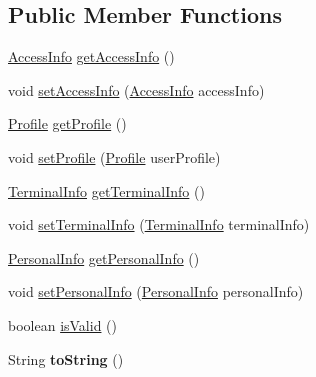 \subsection*{Public Member Functions}
\begin{DoxyCompactItemize}
\item 
\hyperlink{classcom_1_1bluevia_1_1directory_1_1data_1_1AccessInfo}{AccessInfo} \hyperlink{classcom_1_1bluevia_1_1directory_1_1data_1_1UserInfo_ad3af785cbd0eaf8851472573da86b528}{getAccessInfo} ()
\item 
void \hyperlink{classcom_1_1bluevia_1_1directory_1_1data_1_1UserInfo_a6997a0457de7f533146f2d4bf41669d2}{setAccessInfo} (\hyperlink{classcom_1_1bluevia_1_1directory_1_1data_1_1AccessInfo}{AccessInfo} accessInfo)
\item 
\hyperlink{classcom_1_1bluevia_1_1directory_1_1data_1_1Profile}{Profile} \hyperlink{classcom_1_1bluevia_1_1directory_1_1data_1_1UserInfo_a5817007f04e9015ab86bc6c4dde1dca7}{getProfile} ()
\item 
void \hyperlink{classcom_1_1bluevia_1_1directory_1_1data_1_1UserInfo_a61ffdc2f17dc7819741f9cf96c2fbdee}{setProfile} (\hyperlink{classcom_1_1bluevia_1_1directory_1_1data_1_1Profile}{Profile} userProfile)
\item 
\hyperlink{classcom_1_1bluevia_1_1directory_1_1data_1_1TerminalInfo}{TerminalInfo} \hyperlink{classcom_1_1bluevia_1_1directory_1_1data_1_1UserInfo_a022d9a33d5eedd90a57f54121d819a99}{getTerminalInfo} ()
\item 
void \hyperlink{classcom_1_1bluevia_1_1directory_1_1data_1_1UserInfo_a78053eb532cb9c5c98cb451bf7e8ed79}{setTerminalInfo} (\hyperlink{classcom_1_1bluevia_1_1directory_1_1data_1_1TerminalInfo}{TerminalInfo} terminalInfo)
\item 
\hyperlink{classcom_1_1bluevia_1_1directory_1_1data_1_1PersonalInfo}{PersonalInfo} \hyperlink{classcom_1_1bluevia_1_1directory_1_1data_1_1UserInfo_a33276cdbafab492b75b13a0aab4c0171}{getPersonalInfo} ()
\item 
void \hyperlink{classcom_1_1bluevia_1_1directory_1_1data_1_1UserInfo_abf84f056b024831d1be64628009026d7}{setPersonalInfo} (\hyperlink{classcom_1_1bluevia_1_1directory_1_1data_1_1PersonalInfo}{PersonalInfo} personalInfo)
\item 
boolean \hyperlink{classcom_1_1bluevia_1_1directory_1_1data_1_1UserInfo_a4a7ddeb7965f44f2e5bbe89c14138c25}{isValid} ()
\item 
\hypertarget{classcom_1_1bluevia_1_1directory_1_1data_1_1UserInfo_a2657c31c28dbee3953fbf18a01a76cdf}{
String {\bfseries toString} ()}
\label{classcom_1_1bluevia_1_1directory_1_1data_1_1UserInfo_a2657c31c28dbee3953fbf18a01a76cdf}

\end{DoxyCompactItemize}


